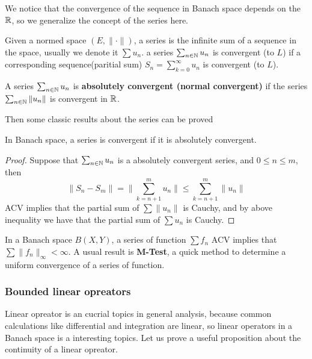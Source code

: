 \documentclass[en,hazy,blue,normal,12pt]{elegantnote}
\begin{document}
We notice that the convergence of the sequence in Banach space depends on the \(\mathbb{R}\), so we generalize the concept of the series here.
\begin{definition}[Series] 
    Given a normed space \((E,\|\cdot\|)\), a series is the infinite sum of a sequence in the space, usually we denote it \(\sum u_n\). a series \(\sum_{n \in \mathbb{N}}u_n\) is convergent (to \(L\)) if a corresponding sequence(paritial sum) \(S_n= \sum_{k=0}^{\infty}u_n\) is convergent (to \(L\)).

    A series \(\sum_{n \in \mathbb{N}}u_n\) is \textbf{absolutely convergent (normal convergent)} if the series \(\sum_{n \in \mathbb{N}}\|u_n\|\) is convergent in \(\mathbb{R}\).
    
\end{definition}

Then some classic results about the series can be proved

\begin{proposition}
    In Banach space, a series is convergent if it is absolutely convergent.
    
    \begin{proof}
        Suppose that \(\sum_{n \in \mathbb{N}}u_n\) is a absolutely convergent series, and \(0 \leq n \leq m \), then 
        \[\|S_n-S_m\| = \|\sum_{k=n+1}^{m}u_n\| \leq \sum_{k=n+1}^{m}\|u_n\|\]
        ACV implies that the partial sum of \(\sum\|u_n\|\) is Cauchy, and by above inequality we have that the partial sum of \(\sum u_n\) is Cauchy.

    \end{proof}
\end{proposition}


\begin{proposition}
    
\end{proposition}

\begin{remark}
    In a Banach space \(B(X,Y)\), a series of function \(\sum f_n\) ACV implies that \(\sum\|f_n\|_{\infty} < \infty\). A usual result is \textbf{M-Test}, a quick method to determine a uniform convergence of a series of function.
\end{remark}

\subsubsection{Bounded linear opreators}

Linear opreator is an cucrial topics in general analysis, because common calculations like differential and integration are linear, so linear operators in a Banach space is a interesting topics. Let us prove a useful proposition about the continuity of a linear opreator.
\end{document}
